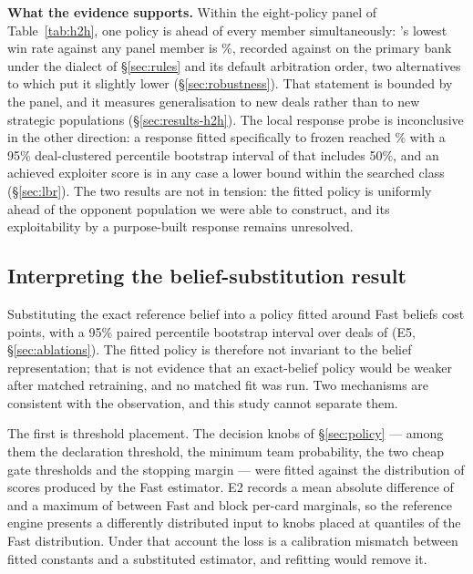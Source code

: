 \textbf{What the evidence supports.} Within the eight-policy panel of
Table~\ref{tab:h2h}, one policy is ahead of every member simultaneously:
\vfast's lowest win rate against any panel member is \numWorstCase\%, recorded
against \vthree{} on the primary bank under the dialect of \S\ref{sec:rules} and
its default arbitration order, two alternatives to which put it slightly lower
(\S\ref{sec:robustness}).
That statement is bounded by the panel, and it measures generalisation to new
deals rather than to new strategic populations (\S\ref{sec:results-h2h}). The
local response probe is inconclusive in the other direction: a response fitted
specifically to frozen \vfast{} reached \numLBRFour\% with a 95\% deal-clustered
percentile bootstrap interval of \numLBRFourCI{} that includes 50\%, and an
achieved exploiter score is in any case a lower bound within the searched class
(\S\ref{sec:lbr}). The two results are not in tension: the fitted policy is
uniformly ahead of the opponent population we were able to construct, and its
exploitability by a purpose-built response remains unresolved.

\subsection{Interpreting the belief-substitution result}

Substituting the exact reference belief into a policy fitted around Fast beliefs
cost \numAblBlock{} points, with a 95\% paired percentile bootstrap interval over
deals of \numAblBlockCI{} (E5, \S\ref{sec:ablations}). The fitted policy is
therefore not invariant to the belief representation; that is not evidence that
an exact-belief policy would be weaker after matched retraining, and no matched
fit was run. Two mechanisms are consistent with the observation, and this study
cannot separate them.

The first is threshold placement. The \numKnobs{} decision knobs of
\S\ref{sec:policy} --- among them the declaration threshold, the minimum team
probability, the two cheap gate thresholds and the stopping margin --- were
fitted against the distribution of scores produced by the Fast estimator. E2
records a mean absolute difference of \numSinkhornMean{} and a maximum of
\numSinkhornMax{} between Fast and block per-card marginals, so the reference
engine presents a differently distributed input to knobs placed at quantiles of
the Fast distribution. Under that account the loss is a calibration mismatch
between fitted constants and a substituted estimator, and refitting would remove
it.

